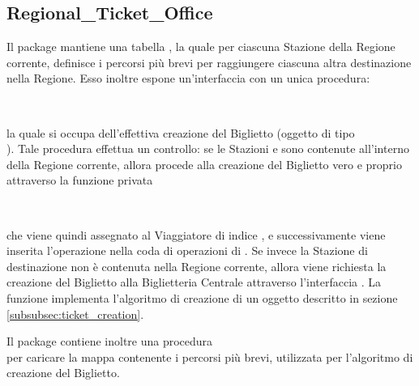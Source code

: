 	\subsection{Regional\_Ticket\_Office}
	
	Il package  mantiene una tabella , la quale per ciascuna Stazione della Regione corrente, definisce i percorsi più brevi per raggiungere ciascuna altra destinazione nella Regione. Esso inoltre espone un'interfaccia con un unica procedura:
	\begin{center}
	 \\
	\end {center}
	la quale si occupa dell'effettiva creazione del Biglietto (oggetto di tipo \\ ). Tale procedura effettua un controllo: se le Stazioni  e  sono contenute all'interno della Regione corrente, allora procede alla creazione del Biglietto vero e proprio attraverso la funzione privata 
	\begin{center}
		 \\
	\end{center}
che viene quindi assegnato al Viaggiatore di indice , e successivamente viene inserita l'operazione  nella coda di operazioni di . Se invece la Stazione di destinazione  non è contenuta nella Regione corrente, allora viene richiesta la creazione del Biglietto alla Biglietteria Centrale attraverso l'interfaccia .
	La funzione  implementa l'algoritmo di creazione di un oggetto  descritto in sezione \ref{subsubsec:ticket_creation}.
	
	Il package  contiene inoltre una procedura \\  per caricare la mappa contenente i percorsi più brevi, utilizzata per l'algoritmo di creazione del Biglietto.
